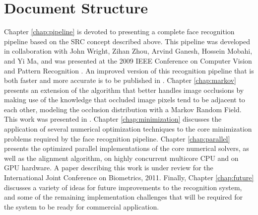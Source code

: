 \section{Document Structure}
%
Chapter \ref{chap:pipeline} is devoted to presenting a complete face
recognition pipeline based on the SRC concept described above. 
This pipeline was developed in collaboration with John Wright,
Zihan Zhou, Arvind Ganesh, Hossein Mobahi, and Yi Ma, and was
presented at the 2009 IEEE Conference on Computer Vision and Pattern Recognition
\cite{WagnerA2009-CVPR}.  An improved version of this recognition pipeline that
is both faster and more accurate is to be published in \cite{WagnerA2011-PAMI}.
%
Chapter \ref{chap:markov} presents an extension of the algorithm that better
handles image occlusions by making use of the knowledge that occluded image
pixels tend to be adjacent to each other, modeling the occlusion distribution
with a Markov Random Field.  This work was presented in \cite{ZhouZ2009}.
%
Chapter \ref{chap:minimization} discusses the application of several numerical
optimization techniques to the core minimization problems required by the face
recognition pipeline.
%
Chapter \ref{chap:parallel} presents the optimized parallel implementations of
the core numerical solvers, as well as the alignment algorithm, on highly
concurrent multicore CPU and on GPU hardware.  A paper describing this work
is under review for the International Joint Conference on Biometrics, 2011.
%
Finally, Chapter \ref{chap:future} discusses a variety of ideas for future
improvements to the recognition system, and some of the remaining
implementation challenges that will be required for the system to be ready for
commercial application.
 

